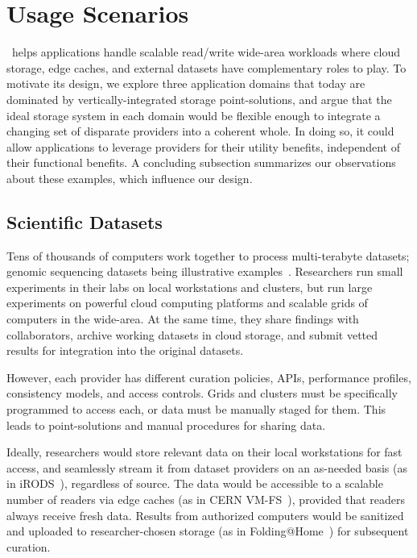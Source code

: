 \section{Usage Scenarios}
\label{sec:motivation}

\Syndicate\ helps applications handle scalable
read/write wide-area workloads where cloud storage, edge
caches, and external datasets have complementary roles to play.  To motivate its
design, we explore three application domains that today are dominated by 
vertically-integrated storage point-solutions, and argue that the ideal 
storage system in each domain would be flexible enough to integrate 
a changing set of disparate providers into a coherent whole.  In doing so, 
it could allow applications to leverage providers 
for their utility benefits, independent of their functional benefits.
A concluding subsection summarizes our observations about these examples,
which influence our design.

\subsection{Scientific Datasets}

Tens of thousands of computers work together to process multi-terabyte
datasets; genomic sequencing datasets being illustrative
examples~\cite{GenBank,metagenomics,1000genomes}.
Researchers run small experiments in their labs on local workstations
and clusters, but run large experiments on powerful cloud computing platforms
and scalable grids of computers in the wide-area.
At the same time, they share findings with collaborators,
archive working datasets in cloud storage,
and submit vetted results for integration into the original datasets.

However, each provider has
different curation policies, APIs, performance profiles, consistency models, and 
access controls.  Grids and clusters must be specifically programmed 
to access each, or data must be manually staged for them.  This leads 
to point-solutions and manual procedures for sharing data.

Ideally, researchers would store relevant data on their
local workstations for fast access, and seamlessly stream it from
dataset providers on an as-needed basis (as in iRODS~\cite{irods}),
regardless of source.  The data would be accessible to a scalable
number of readers via edge caches (as in CERN VM-FS~\cite{cern-vmfs}),
provided that readers always receive fresh data.  Results from
authorized computers would be sanitized and uploaded to
researcher-chosen storage (as in Folding@Home~\cite{folding-at-home})
for subsequent curation.

